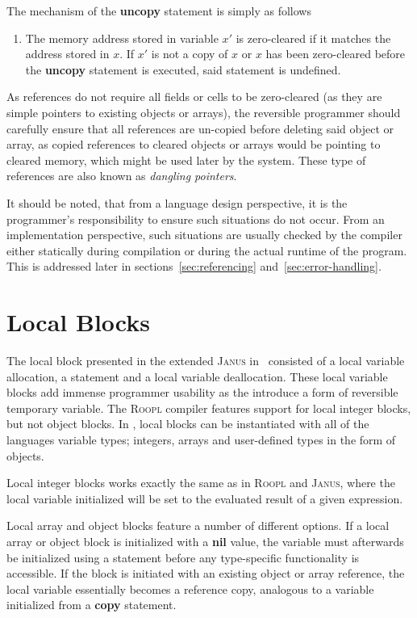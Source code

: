 The mechanism of the \textbf{uncopy} statement is simply as follows
\begin{enumerate}
    \item The memory address stored in variable $x'$ is zero-cleared if it matches the address stored in $x$. If $x'$ is not a copy of $x$ or $x$ has been zero-cleared before the \textbf{uncopy} statement is executed, said statement is undefined.
\end{enumerate}
As references do not require all fields or cells to be zero-cleared (as they are simple pointers to existing objects or arrays), the reversible programmer should carefully ensure that all references are un-copied before deleting said object or array, as copied references to cleared objects or arrays would be pointing to cleared memory, which might be used later by the system. These type of references are also known as \textit{dangling pointers}.

It should be noted, that from a language design perspective, it is the programmer's responsibility to ensure such situations do not occur. From an implementation perspective, such situations are usually checked by the compiler either statically during compilation or during the actual runtime of the program. This is addressed later in sections~\ref{sec:referencing} and~\ref{sec:error-handling}.

\newpage
\section{Local Blocks}
\label{sec:local-blocks}
The local block presented in the extended \textsc{Janus} in~\cite{ty:ejanus} consisted of a local variable allocation, a statement and a local variable deallocation. These local variable blocks add immense programmer usability as the introduce a form of reversible temporary variable. The \textsc{Roopl} compiler features support for local integer blocks, but not object blocks. In \rooplpp, local blocks can be instantiated with all of the languages variable types; integers, arrays and user-defined types in the form of objects.

Local integer blocks works exactly the same as in \textsc{Roopl} and \textsc{Janus}, where the local variable initialized will be set to the evaluated result of a given expression.

Local array and object blocks feature a number of different options. If a local array or object block is initialized with a \textbf{nil} value, the variable must afterwards be initialized using a  statement before any type-specific functionality is accessible. If the block is initiated with an existing object or array reference, the local variable essentially becomes a reference copy, analogous to a variable initialized from a \textbf{copy} statement. 

